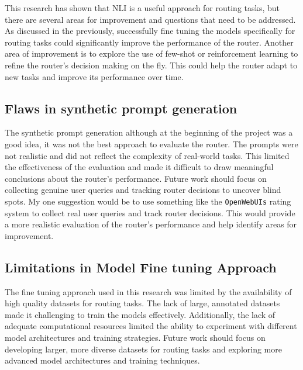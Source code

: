 This research has shown that NLI is a useful approach for routing tasks, but there are several areas for improvement and questions that need to be addressed. As discussed in the previously, successfully fine tuning the models specifically for routing tasks could significantly improve the performance of the router. Another area of improvement is to explore the use of few-shot or reinforcement learning to refine the router's decision making on the fly. This could help the router adapt to new tasks and improve its performance over time.

\subsection{Flaws in synthetic prompt generation}
\label{sec:results-flaws-in-synthetic-prompt-generation}

The synthetic prompt generation although at the beginning of the project was a good idea, it was not the best approach to evaluate the router. The prompts were not realistic and did not reflect the complexity of real-world tasks. This limited the effectiveness of the evaluation and made it difficult to draw meaningful conclusions about the router's performance. Future work should focus on collecting genuine user queries and tracking router decisions to uncover blind spots. My one suggestion would be to use something like the \texttt{OpenWebUIs} rating system to collect real user queries and track router decisions. This would provide a more realistic evaluation of the router's performance and help identify areas for improvement.


\subsection{Limitations in Model Fine tuning Approach}
\label{sec:results-limitations-in-model-fine-tuning-approach}

The fine tuning approach used in this research was limited by the availability of high quality datasets for routing tasks. The lack of large, annotated datasets made it challenging to train the models effectively. Additionally, the lack of adequate computational resources limited the ability to experiment with different model architectures and training strategies. Future work should focus on developing larger, more diverse datasets for routing tasks and exploring more advanced model architectures and training techniques.
